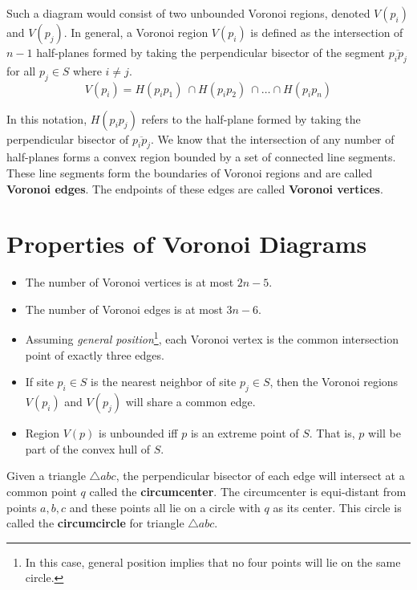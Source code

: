 Such a diagram would consist of two unbounded Voronoi regions, denoted
$V(p_i)$ and $V(p_j)$.  In general, a Voronoi region $V(p_i)$ is
defined as the intersection of $n-1$ half-planes formed by taking the
perpendicular bisector of the segment $\overline{p_i p_j}$ for all
$p_j \in S$ where $i \neq j$.
\[ V(p_i) = H(p_i p_1) \ \cap H(p_i p_2) \ \cap \ldots \cap
H(p_i p_n) \]

\begin{center}
\end{center}

In this notation, $H(p_i p_j)$ refers to the half-plane formed by
taking the perpendicular bisector of $\overline{p_i p_j}$.  We know
that the intersection of any number of half-planes forms a convex
region bounded by a set of connected line segments. These line
segments form the boundaries of Voronoi regions and are called {\bf
Voronoi edges}.  The endpoints of these edges are called {\bf Voronoi
vertices}.

\section{Properties of Voronoi Diagrams}

\begin{itemize}
\item The number of Voronoi vertices is at most $2n - 5$.

\item The number of Voronoi edges is at most $3n - 6$.

\item Assuming {\em general position}\footnote{In this case, general
position implies that no four points will lie on the same circle.},
each Voronoi vertex is the common intersection point of exactly three
edges.

\item If site $p_i \in S$ is the nearest neighbor of site $p_j \in S$,
then the Voronoi regions $V(p_i)$ and $V(p_j)$ will share a common
edge.

\item Region $V(p)$ is unbounded iff $p$ is an extreme point of $S$.
That is, $p$ will be part of the convex hull of $S$.
\end{itemize}

Given a triangle $\triangle abc$, the perpendicular bisector of each
edge will intersect at a common point $q$ called the {\bf
circumcenter}.  The circumcenter is equi-distant from points $a,b,c$
and these points all lie on a circle with $q$ as its center.  This
circle is called the {\bf circumcircle} for triangle $\triangle abc$.

